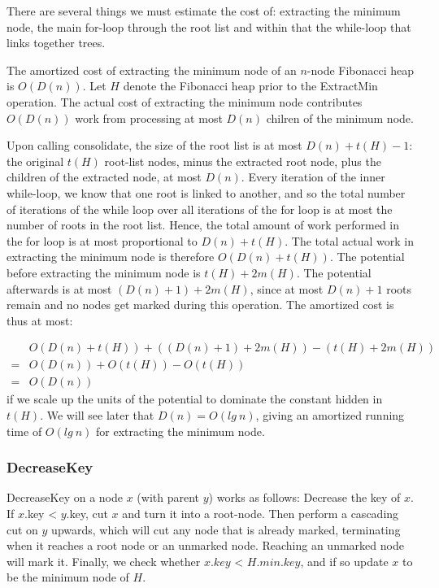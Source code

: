 There are several things we must estimate the cost of:
extracting the minimum node, the main for-loop through the root
list and within that the while-loop that links together trees.

The amortized cost of extracting the minimum node of an $n$-node
Fibonacci heap is $O(D(n))$. Let $H$ denote the
Fibonacci heap prior to the ExtractMin operation. The actual
cost of extracting the minimum node contributes $O(D(n))$ work
from processing at most $D(n)$ chilren of the minimum node.

Upon calling consolidate, the size of the root list is at most $D(n) + t(H) -
1$: the original $t(H)$ root-list nodes, minus the extracted root node, plus
the children of the extracted node, at most $D(n)$. Every iteration of the
inner while-loop, we know that one root is linked to another, and so the total
number of iterations of the while loop over all iterations of the for loop is
at most the number of roots in the root list. Hence, the total amount of work
performed in the for loop is at most proportional to $D(n) + t(H)$. The total
actual work in extracting the minimum node is therefore $O(D(n) + t(H))$. The
potential before extracting the minimum node is $t(H) + 2m(H)$. The potential
afterwards is at most $(D(n)+1)+2m(H)$, since at most $D(n)+1$ roots remain and
no nodes get marked during this operation. The amortized cost is thus at most:

\begin{align*}
	& O(D(n)+t(H)) + ((D(n)+1) + 2m(H)) - (t(H)+2m(H)) \\
	=& O(D(n)) + O(t(H)) - O(t(H)) \\
	=& O(D(n))
\end{align*}
if we scale up the units of the potential to dominate the constant hidden in $t(H)$.
We will see later that $D(n) = O(lg\ n)$, giving an amortized running time of $O(lg\ n)$
for extracting the minimum node.

\subsubsection{DecreaseKey}
DecreaseKey on a node $x$ (with parent $y$) works as follows: Decrease the key
of $x$. If $x$.key < $y$.key, cut $x$ and turn it into a root-node. Then perform
a cascading cut on $y$ upwards, which will cut any node that is already marked,
terminating when it reaches a root node or an unmarked node. Reaching an unmarked node
will mark it. Finally, we check whether $x.key$ < $H.min.key$, and if so update $x$ to
be the minimum node of $H$.

